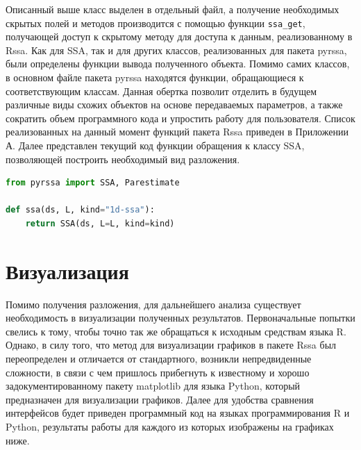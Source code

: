 \documentclass[specialist,
			   substylefile = spbu_report.rtx,
			   subf,href,colorlinks=true, 12pt]{disser}
\begin{document}
Описанный выше класс выделен в отдельный файл, а получение необходимых скрытых полей и методов производится с помощью функции \verb|ssa_get|, получающей доступ к скрытому методу для доступа к данным, реализованному в Rssa. Как для SSA, так и для других классов, реализованных для пакета pyrssa, были определены функции вывода полученного объекта. Помимо самих классов, в основном файле пакета pyrssa находятся функции, обращающиеся к соответствующим классам. Данная обертка позволит отделить в будущем различные виды схожих объектов на основе передаваемых параметров, а также сократить объем программного кода и упростить работу для пользователя. Список реализованных на данный момент функций пакета Rssa приведен в Приложении А. Далее представлен текущий код функции обращения к классу SSA, позволяющей построить необходимый вид разложения.

\begin{lstlisting}[language=Python, caption=Реализация функции для обращения к типу данных SSA в Python.]
from pyrssa import SSA, Parestimate

def ssa(ds, L, kind="1d-ssa"):
	return SSA(ds, L=L, kind=kind)	
\end{lstlisting}

\section{Визуализация}

Помимо получения разложения, для дальнейшего анализа существует необходимость в визуализации полученных результатов. Первоначальные попытки свелись к тому, чтобы точно так же обращаться к исходным средствам языка R. Однако, в силу того, что метод для визуализации графиков в пакете Rssa был переопределен и отличается от стандартного, возникли непредвиденные сложности, в связи с чем пришлось прибегнуть к известному и хорошо задокументированному пакету matplotlib \cite{matplotlib-doc} для языка Python, который предназначен для визуализации графиков. Далее для удобства сравнения интерфейсов будет приведен программный код на языках программирования R и Python, результаты работы для каждого из которых изображены на графиках ниже.
\end{document}
